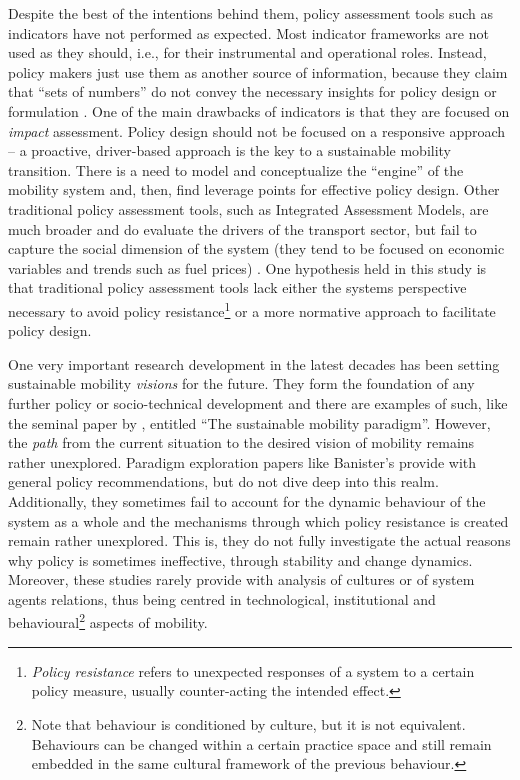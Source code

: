 Despite the best of the intentions behind them, policy assessment tools such as indicators have not performed as expected. Most indicator frameworks are not used as they should, i.e., for their instrumental and operational roles. Instead, policy makers just use them as another source of information, because they claim that ``sets of numbers'' do not convey the necessary insights for policy design or formulation \parencite{gudmundsson2013_SomeuseLittleinfluence}. One of the main drawbacks of indicators is that they are focused on \emph{impact} assessment. Policy design should not be focused on a responsive approach -- a proactive, driver-based approach is the key to a sustainable mobility transition. There is a need to model and conceptualize the ``engine'' of the mobility system and, then, find leverage points for effective policy design. Other traditional policy assessment tools, such as Integrated Assessment Models, are much broader and do evaluate the drivers of the transport sector, but fail to capture the social dimension of the system (they tend to be focused on economic variables and trends such as fuel prices) \parencite{creutzig2015_EvolvingNarrativesLow}. One hypothesis held in this study is that traditional policy assessment tools lack either the systems perspective necessary to avoid policy resistance\footnote{\emph{Policy resistance} refers to unexpected responses of a system to a certain policy measure, usually counter-acting the intended effect.} or a more normative approach to facilitate policy design.

One very important research development in the latest decades has been setting sustainable mobility \emph{visions} for the future. They form the foundation of any further policy or socio-technical development and there are examples of such, like the seminal paper by \textcite{banister2008_sustainablemobilityparadigm}, entitled ``The sustainable mobility paradigm''. However, the \emph{path} from the current situation to the desired vision of mobility remains rather unexplored. Paradigm exploration papers like Banister's provide with general policy recommendations, but do not dive deep into this realm. Additionally, they sometimes fail to account for the dynamic behaviour of the system as a whole and the mechanisms through which policy resistance is created remain rather unexplored. This is, they do not fully investigate the actual reasons why policy is sometimes ineffective, through stability and change dynamics. Moreover, these studies rarely provide with analysis of cultures or of system agents relations, thus being centred in technological, institutional and behavioural\footnote{Note that behaviour is conditioned by culture, but it is not equivalent. Behaviours can be changed within a certain practice space and still remain embedded in the same cultural framework of the previous behaviour.} aspects of mobility.

